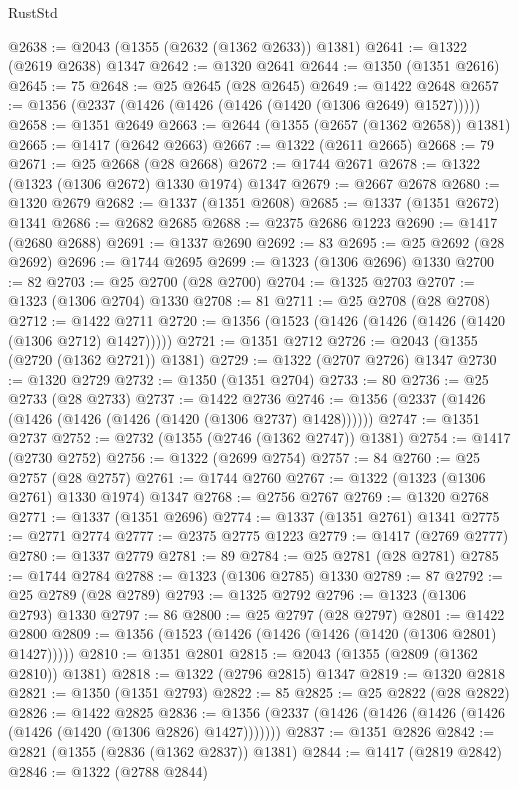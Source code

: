 \begin{lexlean}{RustStd}
\begin{coremodule}
@2638 := @2043 (@1355 (@2632 (@1362 @2633)) @1381)
@2641 := @1322 (@2619 @2638) @1347
@2642 := @1320 @2641
@2644 := @1350 (@1351 @2616)
@2645 := 75
@2648 := @25 @2645 (@28 @2645)
@2649 := @1422 @2648
@2657 := @1356 (@2337 (@1426 (@1426 (@1426 (@1420 (@1306 @2649) @1527)))))
@2658 := @1351 @2649
@2663 := @2644 (@1355 (@2657 (@1362 @2658)) @1381)
@2665 := @1417 (@2642 @2663)
@2667 := @1322 (@2611 @2665)
@2668 := 79
@2671 := @25 @2668 (@28 @2668)
@2672 := @1744 @2671
@2678 := @1322 (@1323 (@1306 @2672) @1330 @1974) @1347
@2679 := @2667 @2678
@2680 := @1320 @2679
@2682 := @1337 (@1351 @2608)
@2685 := @1337 (@1351 @2672) @1341
@2686 := @2682 @2685
@2688 := @2375 @2686 @1223
@2690 := @1417 (@2680 @2688)
@2691 := @1337 @2690
@2692 := 83
@2695 := @25 @2692 (@28 @2692)
@2696 := @1744 @2695
@2699 := @1323 (@1306 @2696) @1330
@2700 := 82
@2703 := @25 @2700 (@28 @2700)
@2704 := @1325 @2703
@2707 := @1323 (@1306 @2704) @1330
@2708 := 81
@2711 := @25 @2708 (@28 @2708)
@2712 := @1422 @2711
@2720 := @1356 (@1523 (@1426 (@1426 (@1426 (@1420 (@1306 @2712) @1427)))))
@2721 := @1351 @2712
@2726 := @2043 (@1355 (@2720 (@1362 @2721)) @1381)
@2729 := @1322 (@2707 @2726) @1347
@2730 := @1320 @2729
@2732 := @1350 (@1351 @2704)
@2733 := 80
@2736 := @25 @2733 (@28 @2733)
@2737 := @1422 @2736
@2746 := @1356 (@2337 (@1426 (@1426 (@1426 (@1426 (@1420 (@1306 @2737) @1428))))))
@2747 := @1351 @2737
@2752 := @2732 (@1355 (@2746 (@1362 @2747)) @1381)
@2754 := @1417 (@2730 @2752)
@2756 := @1322 (@2699 @2754)
@2757 := 84
@2760 := @25 @2757 (@28 @2757)
@2761 := @1744 @2760
@2767 := @1322 (@1323 (@1306 @2761) @1330 @1974) @1347
@2768 := @2756 @2767
@2769 := @1320 @2768
@2771 := @1337 (@1351 @2696)
@2774 := @1337 (@1351 @2761) @1341
@2775 := @2771 @2774
@2777 := @2375 @2775 @1223
@2779 := @1417 (@2769 @2777)
@2780 := @1337 @2779
@2781 := 89
@2784 := @25 @2781 (@28 @2781)
@2785 := @1744 @2784
@2788 := @1323 (@1306 @2785) @1330
@2789 := 87
@2792 := @25 @2789 (@28 @2789)
@2793 := @1325 @2792
@2796 := @1323 (@1306 @2793) @1330
@2797 := 86
@2800 := @25 @2797 (@28 @2797)
@2801 := @1422 @2800
@2809 := @1356 (@1523 (@1426 (@1426 (@1426 (@1420 (@1306 @2801) @1427)))))
@2810 := @1351 @2801
@2815 := @2043 (@1355 (@2809 (@1362 @2810)) @1381)
@2818 := @1322 (@2796 @2815) @1347
@2819 := @1320 @2818
@2821 := @1350 (@1351 @2793)
@2822 := 85
@2825 := @25 @2822 (@28 @2822)
@2826 := @1422 @2825
@2836 := @1356 (@2337 (@1426 (@1426 (@1426 (@1426 (@1426 (@1420 (@1306 @2826) @1427)))))))
@2837 := @1351 @2826
@2842 := @2821 (@1355 (@2836 (@1362 @2837)) @1381)
@2844 := @1417 (@2819 @2842)
@2846 := @1322 (@2788 @2844)

\end{coremodule}
\end{lexlean}
